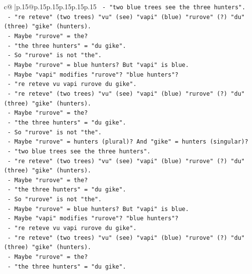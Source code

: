 \documentclass{article}
\begin{document}
{\begin{supertabular}{c@{$\;$}|p{.15\linewidth}@{}p{.15\linewidth}p{.15\linewidth}p{.15\linewidth}p{.15\linewidth}p{.15\linewidth}}
{{{\texttt{           {-} "two blue trees see the three hunters".} \\
\texttt{           {-} "re reteve" (two trees) "vu" (see) "vapi" (blue) "rurove" (?) "du" (three) "gike" (hunters).} \\
\texttt{           {-} Maybe "rurove" = the?} \\
\texttt{           {-} "the three hunters" = "du gike".} \\
\texttt{           {-} So "rurove" is not "the".} \\
\texttt{           {-} Maybe "rurove" = blue hunters? But "vapi" is blue.} \\
\texttt{           {-} Maybe "vapi" modifies "rurove"? "blue hunters"?} \\
\texttt{           {-} "re reteve vu vapi rurove du gike".} \\
\texttt{           {-} "re reteve" (two trees) "vu" (see) "vapi" (blue) "rurove" (?) "du" (three) "gike" (hunters).} \\
\texttt{           {-} Maybe "rurove" = the?} \\
\texttt{           {-} "the three hunters" = "du gike".} \\
\texttt{           {-} So "rurove" is not "the".} \\
\texttt{           {-} Maybe "rurove" = hunters (plural)? And "gike" = hunters (singular)?} \\
\texttt{           {-} "two blue trees see the three hunters".} \\
\texttt{           {-} "re reteve" (two trees) "vu" (see) "vapi" (blue) "rurove" (?) "du" (three) "gike" (hunters).} \\
\texttt{           {-} Maybe "rurove" = the?} \\
\texttt{           {-} "the three hunters" = "du gike".} \\
\texttt{           {-} So "rurove" is not "the".} \\
\texttt{           {-} Maybe "rurove" = blue hunters? But "vapi" is blue.} \\
\texttt{           {-} Maybe "vapi" modifies "rurove"? "blue hunters"?} \\
\texttt{           {-} "re reteve vu vapi rurove du gike".} \\
\texttt{           {-} "re reteve" (two trees) "vu" (see) "vapi" (blue) "rurove" (?) "du" (three) "gike" (hunters).} \\
\texttt{           {-} Maybe "rurove" = the?} \\
\texttt{           {-} "the three hunters" = "du gike".} \\
}}}
\end{supertabular}}
\end{document}

